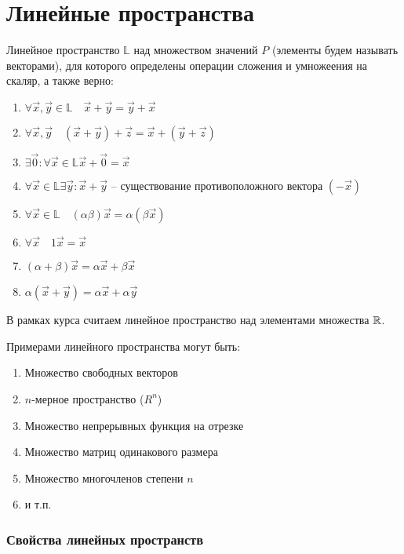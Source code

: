 \section{Линейные пространства}

\begin{definition}
    Линейное пространство $\mathbb{L}$ над множеством значений $P$ (элементы будем называть векторами), для которого определены операции сложения и умножеения на скаляр, а также верно:
    \begin{enumerate}
        \item $\forall \vec{x}, \vec{y} \in \mathbb{L} \quad \vec{x} + \vec{y} = \vec{y} + \vec{x}$
        \item $\forall \vec{x}, \vec{y} \quad (\vec{x} + \vec{y}) + \vec{z} = \vec{x} + (\vec{y} + \vec{z})$
        \item $\exists \vec{0} : \forall \vec{x} \in \mathbb{L} \vec{x} + \vec{0} = \vec{x}$
        \item $\forall \vec{x} \in \mathbb{L} \exists \vec{y} : \vec{x} + \vec{y}$ -- существование противоположного вектора $(-\vec{x})$
        \item $\forall \vec{x} \in \mathbb{L} \quad (\alpha \beta) \vec{x} = \alpha (\beta \vec{x})$
        \item $\forall \vec{x} \quad 1 \vec{x} = \vec{x}$ 
        \item $(\alpha + \beta) \vec{x} = \alpha \vec{x} + \beta \vec{x}$
        \item $\alpha(\vec{x} + \vec{y}) = \alpha \vec{x} + \alpha \vec{y}$ 
    \end{enumerate}
\end{definition}

В рамках курса считаем линейное пространство над элементами множества $\mathbb{R}$. 

Примерами линейного пространства могут быть:
\begin{enumerate}
    \item Множество свободных векторов
    \item $n$-мерное пространство ($R^n$) 
    \item Множество непрерывных функция на отрезке
    \item Множество матриц одинакового размера
    \item Множество многочленов степени $n$
    \item и т.п.
\end{enumerate}

\subsubsection{Свойства линейных пространств}

